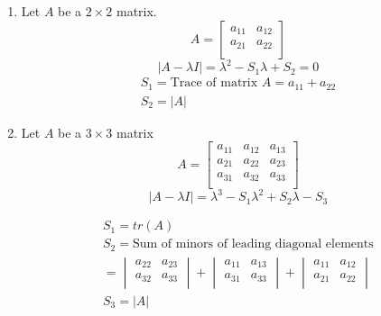 \documentclass[english,course,fleqn]{lecture}
\begin{document}
  \begin{enumerate}
    \item Let $A$ be a $2 \times 2$ matrix.
      \[
        A = \begin{bmatrix}
          a_{11} & a_{12} \\
          a_{21} & a_{22} \\
        \end{bmatrix}
      \]
      \[
        | A - \lambda I| = \lambda^{2} - S_{1}\lambda + S_{2} = 0
      \]
      \begin{gather*}
        S_{1} =  \text{Trace of matrix } A = a_{11} + a_{22}\\
        S_{2} = |A|
      \end{gather*}

    \item Let $A$ be a $3 \times 3$ matrix
      \[
        A = \begin{bmatrix}
          a_{11} & a_{12} & a_{13} \\
          a_{21} & a_{22} & a_{23} \\
          a_{31} & a_{32} & a_{33} \\
        \end{bmatrix}
      \]
      \[
        |A - \lambda I| = \lambda^{3} - S_{1}\lambda^{2} + S_{2} \lambda - S_{3}
      \]

      \begin{gather*}
        S_{1} = tr(A)\\
        S_{2} = \text{Sum of minors of leading diagonal elements}\\
        = \begin{vmatrix}
          a_{22} & a_{23} \\
          a_{32} & a_{33} \\
          \end{vmatrix} + \begin{vmatrix}
          a_{11} & a_{13} \\
          a_{31} & a_{33} \\
          \end{vmatrix} + \begin{vmatrix}
          a_{11} & a_{12} \\
          a_{21} & a_{22} \\
        \end{vmatrix}\\
        S_{3} = |A|
      \end{gather*}
  \end{enumerate}
\end{document}

